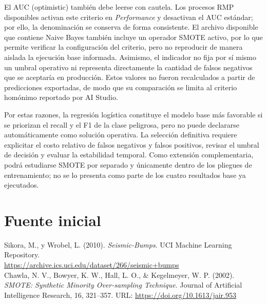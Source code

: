 \documentclass[12pt,a4paper]{article}
\begin{document}
El AUC (optimistic) también debe leerse con cautela. Los procesos RMP disponibles activan este criterio en \textit{Performance} y desactivan el AUC estándar; por ello, la denominación se conserva de forma consistente. El archivo disponible que contiene Naive Bayes también incluye un operador SMOTE activo, por lo que permite verificar la configuración del criterio, pero no reproducir de manera aislada la ejecución base informada. Asimismo, el indicador no fija por sí mismo un umbral operativo ni representa directamente la cantidad de falsos negativos que se aceptaría en producción. Estos valores no fueron recalculados a partir de predicciones exportadas, de modo que su comparación se limita al criterio homónimo reportado por AI Studio.

Por estas razones, la regresión logística constituye el modelo base más favorable si se priorizan el recall y el F1 de la clase peligrosa, pero no puede declararse automáticamente como solución operativa. La selección definitiva requiere explicitar el costo relativo de falsos negativos y falsos positivos, revisar el umbral de decisión y evaluar la estabilidad temporal. Como extensión complementaria, podrá estudiarse SMOTE por separado y únicamente dentro de los pliegues de entrenamiento; no se lo presenta como parte de los cuatro resultados base ya ejecutados.

\section{Fuente inicial}
Sikora, M., y Wrobel, L. (2010). \textit{Seismic-Bumps}. UCI Machine Learning Repository.\\
\url{https://archive.ics.uci.edu/dataset/266/seismic+bumps}\\
Chawla, N. V., Bowyer, K. W., Hall, L. O., \& Kegelmeyer, W. P. (2002). \textit{SMOTE: Synthetic Minority Over-sampling Technique}. Journal of Artificial Intelligence Research, 16, 321--357. URL: \url{https://doi.org/10.1613/jair.953}
\end{document}

